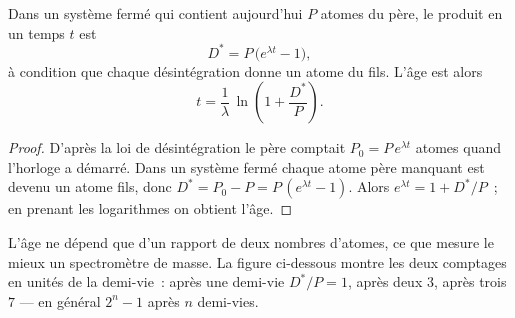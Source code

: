 \begin{proposition}\label{prop:b1:radiometric-methods:growth}
Dans un système fermé qui contient aujourd'hui $P$ atomes du père, le  produit en un temps $t$ est
\[
  D^* = P\,\bigl(e^{\lambda t} - 1\bigr),
\]
à condition que chaque désintégration donne un atome du fils. L'âge est alors
\[
  t = \frac{1}{\lambda}\,\ln\!\left(1 + \frac{D^*}{P}\right).
\]
\end{proposition}

\begin{proof}
D'après la loi de désintégration le père comptait $P_0 = P\,e^{\lambda t}$ atomes quand l'horloge
a démarré. Dans un système fermé chaque atome père manquant est devenu un atome
fils, donc $D^* = P_0 - P = P\,(e^{\lambda t} - 1)$. Alors $e^{\lambda t} = 1 +
D^*/P$~; en prenant les logarithmes on obtient l'âge.
\end{proof}

L'âge ne dépend que d'un rapport de deux nombres d'atomes, ce que mesure le mieux un
spectromètre de masse. La figure ci-dessous montre les deux comptages en unités de
la demi-vie~: après une demi-vie $D^*/P = 1$, après deux $3$, après trois $7$
--- en général $2^n - 1$ après $n$ demi-vies.

